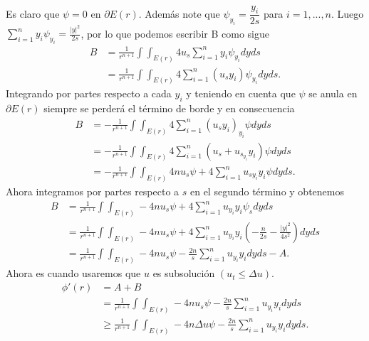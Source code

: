 \begin{homeworkProblem}
\begin{solucion}
\begin{align*}
    \end{align*}
    Es claro que $\psi = 0$ en $\partial E(r)$. Además note que $\psi_{y_{i}}=\dfrac{y_{i}}{2s}$ para $i=1,...,n$. Luego $\displaystyle \sum_{i=1}^{n} y_{i}\psi_{y_{i}} = \frac{|y|^{2}}{2s}$, por lo que podemos escribir B como sigue
    \begin{align*}
      B &= \frac{1}{r^{n+1}} \int \int_{E(r)} 4u_{s} \displaystyle \sum_{i=1}^{n} y_{i}\psi_{y_{i}} dyds\\ 
        & = \frac{1}{r^{n+1}} \int \int_{E(r)} 4\displaystyle \sum_{i=1}^{n} (u_{s} y_{i}) \psi_{y_{i}} dyds.
    \end{align*}
    Integrando por partes respecto a cada $y_{i}$ y teniendo en cuenta que $\psi$ se anula en $\partial E(r)$ siempre se perderá el término de borde y en consecuencia
    \begin{align*}
      B &= -\frac{1}{r^{n+1}} \int \int_{E(r)} 4\displaystyle \sum_{i=1}^{n} (u_{s} y_{i})_{y_{i}} \psi dyds\\ 
        &= -\frac{1}{r^{n+1}} \int \int_{E(r)} 4\displaystyle \sum_{i=1}^{n} (u_{s} + u_{s_{y_{i}}}y_{i})\psi dyds\\ 
        &= -\frac{1}{r^{n+1}} \int \int_{E(r)} 4n u_{s}\psi + 4\displaystyle \sum_{i=1}^{n} u_{sy_{i}}y_{i}\psi dyds.
    \end{align*}
    Ahora integramos por partes respecto a $s$ en el segundo término y obtenemos 
    \begin{align*}
      B &= \frac{1}{r^{n+1}} \int \int_{E(r)} -4n u_{s}\psi + 4\displaystyle \sum_{i=1}^{n} u_{y_{i}}y_{i}\psi_{s} dyds\\ 
        &= \frac{1}{r^{n+1}} \int \int_{E(r)} -4n u_{s}\psi + 4\displaystyle \sum_{i=1}^{n} u_{y_{i}}y_{i} \left( -\frac{n}{2s} - \frac{|y|^{2}}{4s^{2}} \right) dyds\\ 
        &= \frac{1}{r^{n+1}} \int \int_{E(r)} -4n u_{s}\psi - \frac{2n}{s} \displaystyle \sum_{i=1}^{n} u_{y_{i}}y_{i} dyds - A.
    \end{align*}
    Ahora es cuando usaremos que $u$ es subsolución $(u_{t} \leq \Delta u )$.
    \begin{align*}
      \phi ' (r) &= A + B\\ 
                 &= \frac{1}{r^{n+1}} \int \int_{E(r)} -4n u_{s}\psi - \frac{2n}{s} \displaystyle \sum_{i=1}^{n} u_{y_{i}}y_{i} dyds\\ 
                 &\geq \frac{1}{r^{n+1}} \int \int_{E(r)} -4n \Delta u\psi - \frac{2n}{s} \displaystyle \sum_{i=1}^{n} u_{y_{i}}y_{i} dyds.
    \end{align*}

\end{solucion}
\end{homeworkProblem}
